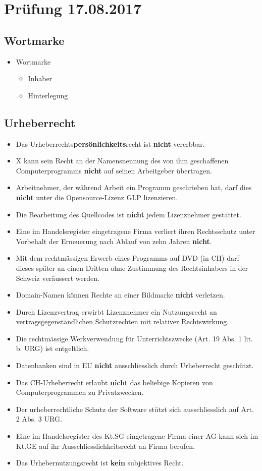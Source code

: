 \section{Prüfung 17.08.2017}

\subsection{Wortmarke}
\begin{itemize}
	\item Wortmarke
	\begin{itemize}
		\item Inhaber
		\item Hinterlegung
	\end{itemize}
\end{itemize}

\subsection{Urheberrecht}
\begin{itemize}
	\item Das Urheberrechts\textbf{persönlichkeits}recht ist \textbf{nicht} vererbbar.
	\item X kann sein Recht an der Namensnennung des von ihm geschaffenen Computerprogramms \textbf{nicht} auf seinen Arbeitgeber übertragen.
	\item Arbeitnehmer, der während Arbeit ein Programm geschrieben hat, darf dies \textbf{nicht} unter die Opensource-Lizenz GLP lizenzieren.
	\item Die Bearbeitung des Quellcodes ist \textbf{nicht} jedem Lizenznehmer gestattet.
	\item Eine im Handelsregister eingetragene Firma verliert ihren Rechtsschutz unter Vorbehalt der Erneuerung nach Ablauf von zehn Jahren \textbf{nicht}.
	\item Mit dem rechtmässigen Erwerb eines Programms auf DVD (in CH) darf dieses später an einen Dritten ohne Zustimmung des Rechtsinhabers in der Schweiz veräussert werden.
	\item Domain-Namen können Rechte an einer Bildmarke \textbf{nicht} verletzen.
	\item Durch Lizenzvertrag erwirbt Lizenznehmer ein Nutzungsrecht an vertragsgegenständlichen Schutzrechten mit relativer Rechtswirkung.
	\item Die rechtmässige Werkverwendung für Unterrichtszwecke (Art. 19 Abs. 1 lit. b. URG) ist entgeltlich.
	\item Datenbanken sind in EU \textbf{nicht} ausschliesslich durch Urheberrecht geschützt.
	\item Das CH-Urheberrecht erlaubt \textbf{nicht} das beliebige Kopieren von Computerprogrammen zu Privatzwecken.
	\item Der urheberrechtliche Schutz der Software stützt sich ausschliesslich auf Art. 2 Abs. 3 URG.
	\item Eine im Handelsregister des Kt.SG eingetragene Firma einer AG kann sich im Kt.GE auf ihr Ausschliesslichkeitsrecht an Firma berufen.
	\item Das Urhebernutzungsrecht ist \textbf{kein} subjektives Recht.
\end{itemize}

